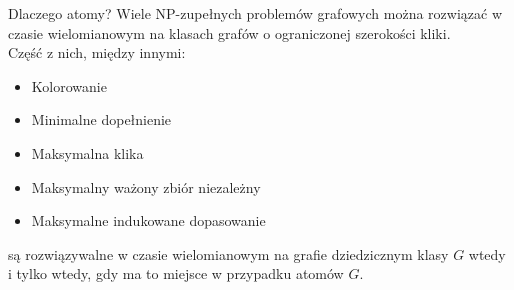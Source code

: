 \documentclass[polish]{beamer}
\begin{document}
\begin{frame}{Dlaczego atomy?}
    Wiele NP-zupełnych problemów grafowych można rozwiązać w czasie wielomianowym na klasach grafów o ograniczonej szerokości kliki.\\
    Część z nich, między innymi:
    \begin{itemize}
        \item Kolorowanie
        \item Minimalne dopełnienie
        \item Maksymalna klika
        \item Maksymalny ważony zbiór niezależny
        \item Maksymalne indukowane dopasowanie
    \end{itemize}    
    są rozwiązywalne w czasie wielomianowym na grafie dziedzicznym klasy $G$ wtedy i tylko wtedy, gdy ma to miejsce w przypadku atomów $G$. 
\end{frame}
\end{document}

